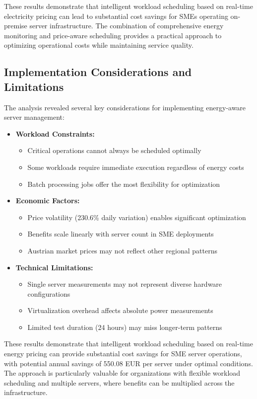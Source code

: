 These results demonstrate that intelligent workload scheduling based on real-time electricity pricing can lead to substantial cost savings for SMEs operating on-premise server infrastructure. The combination of comprehensive energy monitoring and price-aware scheduling provides a practical approach to optimizing operational costs while maintaining service quality.

\subsection{Implementation Considerations and Limitations}
\label{results:limitations}
The analysis revealed several key considerations for implementing energy-aware server management:

\begin{itemize}
    \item \textbf{Workload Constraints:}
    \begin{itemize}
        \item Critical operations cannot always be scheduled optimally
        \item Some workloads require immediate execution regardless of energy costs
        \item Batch processing jobs offer the most flexibility for optimization
    \end{itemize}
    
    \item \textbf{Economic Factors:}
    \begin{itemize}
        \item Price volatility (230.6\% daily variation) enables significant optimization
        \item Benefits scale linearly with server count in SME deployments
        \item Austrian market prices may not reflect other regional patterns
    \end{itemize}
    
    \item \textbf{Technical Limitations:}
    \begin{itemize}
        \item Single server measurements may not represent diverse hardware configurations
        \item Virtualization overhead affects absolute power measurements
        \item Limited test duration (24 hours) may miss longer-term patterns
    \end{itemize}
\end{itemize}

These results demonstrate that intelligent workload scheduling based on real-time energy pricing can provide substantial cost savings for SME server operations, with potential annual savings of 550.08 EUR per server under optimal conditions. The approach is particularly valuable for organizations with flexible workload scheduling and multiple servers, where benefits can be multiplied across the infrastructure. 